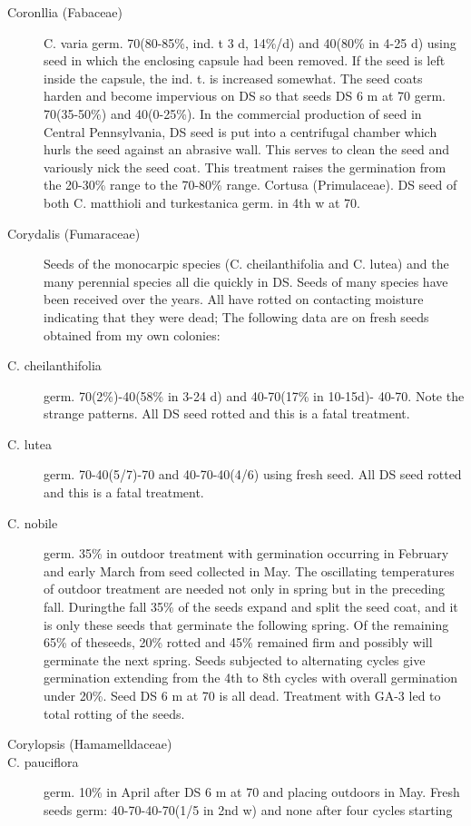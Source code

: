 \begin{description}
\item [Coronllia (Fabaceae)] C. varia germ. 70(80-85\%, ind. t 3 d, 14\%/d) and
40(80\% in 4-25 d) using seed in which the enclosing capsule had been removed. If
the seed is left inside the capsule, the ind. t. is increased somewhat. The seed coats
harden and become impervious on DS so that seeds DS 6 m at 70 germ. 70(35-50\%)
and 40(0-25\%). In the commercial production of seed in Central Pennsylvania, DS
seed is put into a centrifugal chamber which hurls the seed against an abrasive wall.
This serves to clean the seed and variously nick the seed coat. This treatment raises
the germination from the 20-30\% range to the 70-80\% range.
Cortusa (Primulaceae). DS seed of both C. matthioli and turkestanica germ.
in 4th w at 70.

\item [Corydalis (Fumaraceae)] Seeds of the monocarpic species (C.
cheilanthifolia and C. lutea) and the many perennial species all die quickly in DS.
Seeds of many species have been received over the years. All have rotted on
contacting moisture indicating that they were dead; The following data are on fresh
seeds obtained from my own colonies:
\item [C. cheilanthifolia] germ. 70(2\%)-40(58\% in 3-24 d) and 40-70(17\% in 10-15d)-
40-70. Note the strange patterns. All DS seed rotted and this is a fatal treatment.
\item [C. lutea] germ. 70-40(5/7)-70 and 40-70-40(4/6) using fresh seed. All DS seed
rotted and this is a fatal treatment.
\item [C. nobile] germ. 35\% in outdoor treatment with germination occurring in
February and early March from seed collected in May. The oscillating temperatures of
outdoor treatment are needed not only in spring but in the preceding fall. Duringthe
fall 35\% of the seeds expand and split the seed coat, and it is only these seeds that
germinate the following spring. Of the remaining 65\% of theseeds, 20\% rotted and
45\% remained firm and possibly will germinate the next spring. Seeds subjected to
alternating cycles give germination extending from the 4th to 8th cycles with overall
germination under 20\%. Seed DS 6 m at 70 is all dead. Treatment with GA-3 led to
total rotting of the seeds.
\item [Corylopsis (Hamamelldaceae)]
\item [C. pauciflora] germ. 10\% in April after DS 6 m at 70 and placing outdoors in
May. Fresh seeds germ: 40-70-40-70(1/5 in 2nd w) and none after four cycles starting

\end{description}
